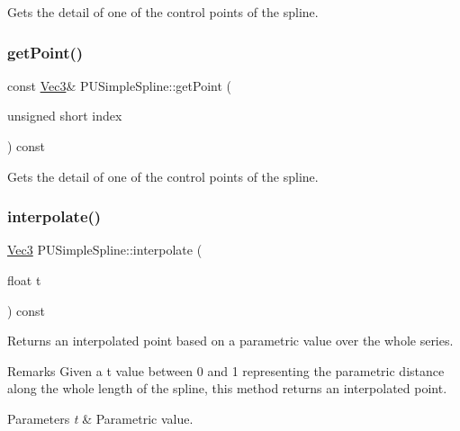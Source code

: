 Gets the detail of one of the control points of the spline. \mbox{\label{classPUSimpleSpline_a64159a11fe5370b9fa3c1f2ee428f294}} 
\subsubsection{\texorpdfstring{get\+Point()}{getPoint()}\hspace{0.1cm}{\footnotesize\ttfamily [2/2]}}
{\footnotesize\ttfamily const \hyperlink{classVec3}{Vec3}\& P\+U\+Simple\+Spline\+::get\+Point (\begin{DoxyParamCaption}\item[{unsigned short}]{index }\end{DoxyParamCaption}) const}

Gets the detail of one of the control points of the spline. \mbox{\label{classPUSimpleSpline_afb14b877762e923b8dd181bb0ea2ab17}} 
\subsubsection{\texorpdfstring{interpolate()}{interpolate()}\hspace{0.1cm}{\footnotesize\ttfamily [1/4]}}
{\footnotesize\ttfamily \hyperlink{classVec3}{Vec3} P\+U\+Simple\+Spline\+::interpolate (\begin{DoxyParamCaption}\item[{float}]{t }\end{DoxyParamCaption}) const}

Returns an interpolated point based on a parametric value over the whole series. \begin{DoxyRemark}{Remarks}
Given a t value between 0 and 1 representing the parametric distance along the whole length of the spline, this method returns an interpolated point. 
\end{DoxyRemark}

\begin{DoxyParams}{Parameters}
{\em t} & Parametric value. \\
\hline
\end{DoxyParams}
\mbox{\label{classPUSimpleSpline_afb14b877762e923b8dd181bb0ea2ab17}} 
